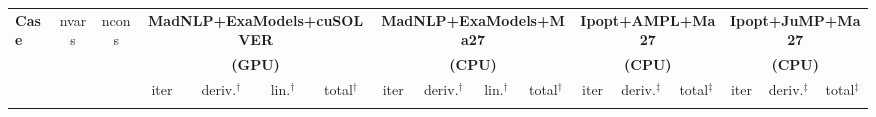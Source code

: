 \documentclass{standalone}
\begin{document}
\centering
\begin{tabular}{|l|c|c|cccc|cccc|ccc|ccc|}
  \hline
  \multirow{3}{*}{\textbf{Case}}
  & \multirow{3}{*}{nvars}
  & \multirow{3}{*}{ncons}
  & \multicolumn{4}{c|}{\textbf{MadNLP+ExaModels+cuSOLVER}}
  & \multicolumn{4}{c|}{\textbf{MadNLP+ExaModels+Ma27}}
  & \multicolumn{3}{c|}{\textbf{Ipopt+AMPL+Ma27}}
  & \multicolumn{3}{c|}{\textbf{Ipopt+JuMP+Ma27}}\\
  & & &\multicolumn{4}{c|}{\textbf{(GPU)}} &\multicolumn{4}{c|}{\textbf{(CPU)}} &\multicolumn{3}{c|}{\textbf{(CPU)}}&\multicolumn{3}{c|}{\textbf{(CPU)}}
  \\
  \cline{4-17}
  & & 
  & iter & deriv.$^\dag$ & lin.$^\dag$ & total$^\dag$
  & iter & deriv.$^\dag$ & lin.$^\dag$ & total$^\dag$
  & iter & deriv.$^\ddag$ & total$^\ddag$
  & iter & deriv.$^\ddag$ & total$^\ddag$
  \\
  \\
  \hline
\end{tabular}
\end{document}
